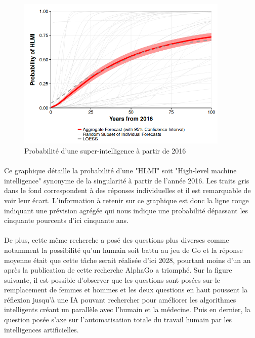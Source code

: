 \documentclass[10pt, french, a4paper]{report}
\begin{document}
\begin{figure}[hbt!]
    \centering
    \includegraphics[width=0.9\textwidth]{images/grace_2017_proba_super_ia.png}
    \caption{Probabilité d'une super-intelligence à partir de 2016 \citep{grace_when_2017}}
    \label{fig:proba_super_ia}
\end{figure}

\paragraph{}
Ce graphique détaille la probabilité d’une "HLMI" soit "High-level machine intelligence" synonyme de la singularité à partir de l’année 2016. Les traits gris dans le fond correspondent à des réponses individuelles et il est remarquable de voir leur écart. L’information à retenir sur ce graphique est donc la ligne rouge indiquant une prévision agrégée qui nous indique une probabilité dépassant les cinquante pourcents d’ici cinquante ans.

\paragraph{}
De plus, cette même recherche a posé des questions plus diverses comme notamment la possibilité qu’un humain soit battu au jeu de Go et la réponse moyenne était que cette tâche serait réalisée d’ici 2028, pourtant moins d’un an après la publication de cette recherche AlphaGo a triomphé. Sur la figure suivante, il est possible d’observer que les questions sont posées sur le remplacement de femmes et hommes et les deux questions en haut poussent la réflexion jusqu’à une IA pouvant rechercher pour améliorer les algorithmes intelligents créant un parallèle avec l’humain et la médecine. Puis en dernier, la question posée s’axe sur l’automatisation totale du travail humain par les intelligences artificielles.
\end{document}
